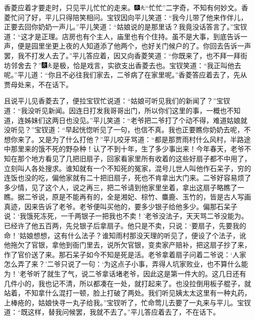 香菱应着才要走时，只见平儿忙忙的走来。{\includegraphics[width=3mm]{../Images/00004}\includegraphics[width=3mm]{../Images/00012}\footnotesize \kaishu “忙忙”二字奇，不知有何妙文。}香菱忙问了好，平儿只得陪笑相问。宝钗因向平儿笑道：“我今儿带了他来作伴儿，正要去回你奶奶一声儿。”平儿笑道：“姑娘说的是那里话？我竟没话答言了。”宝钗道：“这才是正理。店房也有个主人，庙里也有个住持。虽不是大事，到底告诉一声，便是园里坐更上夜的人知道添了他两个，也好关门候户的了。你回去告诉一声罢，我不打发人去了。”平儿答应着，因又向香菱笑道：“你既来了，也不拜一拜街坊邻舍去？”{\includegraphics[width=3mm]{../Images/00004}\includegraphics[width=3mm]{../Images/00012}\footnotesize \kaishu 是极，恰是戏言，实欲支出香菱去也。}宝钗笑道：“我正叫他去呢。”平儿道：“你且不必往我们家去，二爷病了在家里呢。”香菱答应着去了，先从贾母处来，不在话下。

且说平儿见香菱去了，便拉宝钗忙说道：“姑娘可听见我们的新闻了？”宝钗道：“我没听见新闻。因连日打发我哥哥出门，所以你们这里的事，一概也不知道，连姊妹们这两日也没见。”平儿笑道：“老爷把二爷打了个动不得，难道姑娘就没听见？”宝钗道：“早起恍惚听见了一句，也信不真。我也正要瞧你奶奶去呢，不想你来了。又是为了什么打他？”平儿咬牙骂道：“都是那贾雨村什么风村，半路途中那里来的饿不死的野杂种！认了不到十年，生了多少事出来！今年春天，老爷不知在那个地方看见了几把旧扇子，回家看家里所有收着的这些好扇子都不中用了，立刻叫人各处搜求。谁知就有一个不知死的冤家，混号儿世人叫他作石呆子，穷的连饭也没的吃，偏他家就有二十把旧扇子，死也不肯拿出大门来。二爷好容易烦了多少情，见了这个人，说之再三，把二爷请到他家里坐着，拿出这扇子略瞧了一瞧。据二爷说，原是不能再有的，全是湘妃、棕竹、麋鹿、玉竹的，皆是古人写画真迹，因来告诉了老爷。老爷便叫买他的，要多少银子给他多少。偏那石呆子说：‘我饿死冻死，一千两银子一把我也不卖！’老爷没法子，天天骂二爷没能为。已经许了他五百两，先兑银子后拿扇子。他只是不卖，只说：‘要扇子，先要我的命！’姑娘想想，这有什么法子？谁知雨村那没天理的听见了，便设了个法子，讹他拖欠了官银，拿他到衙门里去，说所欠官银，变卖家产赔补，把这扇子抄了来，作了官价送了来。那石呆子如今不知是死是活。老爷拿着扇子问着二爷说：‘人家怎么弄了来？’二爷只说了一句：‘为这点子小事，弄得人坑家败业，也不算什么能为！’老爷听了就生了气，说二爷拿话堵老爷，因此这是第一件大的。这几日还有几件小的，我也记不清，所以都凑在一处，就打起来了。也没拉倒用板子棍子，就站着，不知拿什么混打一顿，脸上打破了两处。我们听见姨太太这里有一种丸药，上棒疮的，姑娘快寻一丸子给我。”宝钗听了，忙命莺儿去要了一丸来与平儿。宝钗道：“既这样，替我问候罢，我就不去了。”平儿答应着去了，不在话下。

